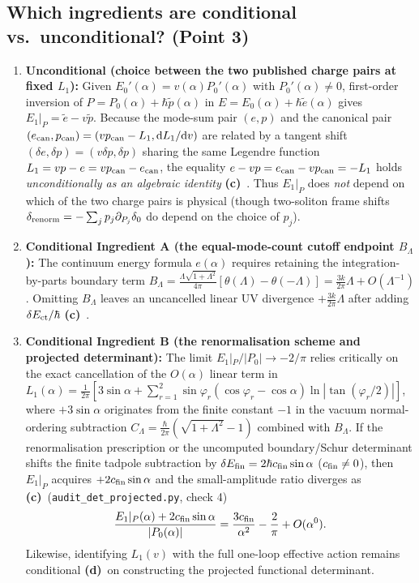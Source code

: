 \documentclass[11pt,a4paper]{article}
\newcommand{\Lc}{\textsf{\textbf{(c)}}\ }
\newcommand{\Ld}{\textsf{\textbf{(d)}}\ }
\newcommand{\scr}{\texttt{audit\_\allowbreak det\_\allowbreak projected.py}}
\newcommand{\dd}{\mathrm d}
\begin{document}
\subsection{Which ingredients are conditional vs.\ unconditional? (Point 3)}
\begin{enumerate}
\item \textbf{Unconditional (choice between the two published charge pairs at fixed $L_1$):}
Given $E_0'(\alpha)=v(\alpha)P_0'(\alpha)$ with $P_0'(\alpha)\ne0$, first-order
inversion of $P=P_0(\alpha)+\hbar\tilde p(\alpha)$ in $E=E_0(\alpha)+\hbar\tilde e(\alpha)$
gives $E_1|_P=\tilde e-v\tilde p$. Because the mode-sum pair $(e,p)$ and the
canonical pair $(e_{\rm can},p_{\rm can})=(vp_{\rm can}-L_1,\dd L_1/\dd v)$ are
related by a tangent shift $(\delta e,\delta p)=(v\delta p,\delta p)$ sharing the
same Legendre function $L_1=vp-e=vp_{\rm can}-e_{\rm can}$, the equality
$e-vp=e_{\rm can}-vp_{\rm can}=-L_1$ holds \emph{unconditionally as an algebraic
identity} \Lc. Thus $E_1|_P$ does \emph{not} depend on which of the two charge
pairs is physical (though two-soliton frame shifts $\delta_{\rm renorm}=-\sum_j p_j\partial_{P_j}\delta_0$
do depend on the choice of $p_j$).
\item \textbf{Conditional Ingredient A (the equal-mode-count cutoff endpoint $B_\Lambda$):}
The continuum energy formula $e(\alpha)$ requires retaining the integration-by-parts
boundary term $B_\Lambda=\frac{\Lambda\sqrt{1+\Lambda^2}}{4\pi}[\theta(\Lambda)-\theta(-\Lambda)]
=\frac{3k}{2\pi}\Lambda+O(\Lambda^{-1})$. Omitting $B_\Lambda$ leaves an uncancelled
linear UV divergence $+\frac{3k}{2\pi}\Lambda$ after adding $\delta E_{\rm ct}/\hbar$ \Lc.
\item \textbf{Conditional Ingredient B (the renormalisation scheme and projected determinant):}
The limit $E_1|_P/|P_0|\to-2/\pi$ relies critically on the exact cancellation of the
$O(\alpha)$ linear term in $L_1(\alpha)=\frac{1}{2\pi}[3\sin\alpha+\sum_{r=1}^2\sin\varphi_r(\cos\varphi_r-\cos\alpha)\ln|\tan(\varphi_r/2)|]$,
where $+3\sin\alpha$ originates from the finite constant $-1$ in the vacuum
normal-ordering subtraction $C_\Lambda=\frac{\hbar}{2\pi}(\sqrt{1+\Lambda^2}-1)$
combined with $B_\Lambda$. If the renormalisation prescription or the uncomputed
boundary/Schur determinant shifts the finite tadpole subtraction by
$\delta E_{\rm fin}=2\hbar c_{\rm fin}\sin\alpha$ ($c_{\rm fin}\ne0$), then
$E_1|_P$ acquires $+2c_{\rm fin}\sin\alpha$ and the small-amplitude ratio diverges as \Lc (\scr, check 4)
\begin{equation}\label{eq:cfin_div}
 \frac{E_1|_P(\alpha)+2c_{\rm fin}\sin\alpha}{|P_0(\alpha)|}
 = \frac{3c_{\rm fin}}{\alpha^2} - \frac{2}{\pi} + O(\alpha^0).
\end{equation}
Likewise, identifying $L_1(v)$ with the full one-loop effective action remains
conditional \Ld on constructing the projected functional determinant.
\end{enumerate}
\end{document}
